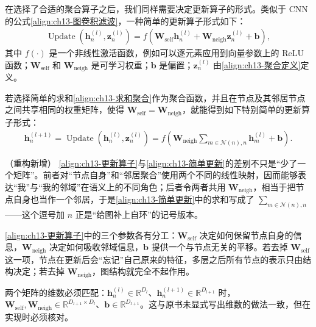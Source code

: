 \documentclass[../../main.tex]{subfiles}
\begin{document}
在选择了合适的聚合算子之后，我们同样需要决定更新算子的形式。类似于 CNN 的公式\eqref{align:ch13-图卷积滤波}，一种简单的更新算子形式如下：
\begin{align}
\operatorname{Update}\!\left(\bm{h}_n^{(l)},\bm{z}_n^{(l)}\right)=f\!\left(\bm{W}_{\mathrm{self}}\bm{h}_n^{(l)}+\bm{W}_{\mathrm{neigh}}\bm{z}_n^{(l)}+\bm{b}\right),
\label{align:ch13-更新算子}
\end{align}
其中 $f(\cdot)$ 是一个非线性激活函数，例如可以逐元素应用到向量参数上的 ReLU 函数；$\bm{W}_{\mathrm{self}}$ 和 $\bm{W}_{\mathrm{neigh}}$ 是可学习权重；$\bm{b}$ 是偏置；$\bm{z}_n^{(l)}$ 由\eqref{align:ch13-聚合定义}定义。

\begin{definition}[更新算子]\label{definition:ch13-更新算子}
若选择简单的求和\eqref{align:ch13-求和聚合}作为聚合函数，并且在节点及其邻居节点之间共享相同的权重矩阵，使得 $\bm{W}_{\mathrm{self}}=\bm{W}_{\mathrm{neigh}}$，就能得到如下特别简单的更新算子形式：
\begin{align}
\bm{h}_n^{(l+1)}=\operatorname{Update}\!\left(\bm{h}_n^{(l)},\bm{z}_n^{(l)}\right)=f\!\left(\bm{W}_{\mathrm{neigh}}\sum_{m\in\mathcal{N}(n),n}\bm{h}_m^{(l)}+\bm{b}\right).
\label{align:ch13-简单更新}
\end{align}
\end{definition}

\begin{remark}（重构新增）
\eqref{align:ch13-更新算子}与\eqref{align:ch13-简单更新}的差别不只是“少了一个矩阵”。前者对“节点自身”和“邻居聚合”使用两个不同的线性映射，因而能够表达“我”与“我的邻域”在语义上的不同角色；后者令两者共用 $\bm{W}_{\mathrm{neigh}}$，相当于把节点自身也当作一个邻居，于是\eqref{align:ch13-简单更新}中的求和写成了 $\sum_{m\in\mathcal{N}(n),n}$——这个逗号加 $n$ 正是“给图补上自环”的记号版本。\par
\eqref{align:ch13-更新算子}中的三个参数各有分工：$\bm{W}_{\mathrm{self}}$ 决定如何保留节点自身的信息，$\bm{W}_{\mathrm{neigh}}$ 决定如何吸收邻域信息，$\bm{b}$ 提供一个与节点无关的平移。若去掉 $\bm{W}_{\mathrm{self}}$ 这一项，节点在更新后会“忘记”自己原来的特征，多层之后所有节点的表示只由结构决定；若去掉 $\bm{W}_{\mathrm{neigh}}$，图结构就完全不起作用。\par
两个矩阵的维数必须匹配：$\bm{h}_n^{(l)}\in\mathbb{R}^{D_l}$、$\bm{h}_n^{(l+1)}\in\mathbb{R}^{D_{l+1}}$ 时，$\bm{W}_{\mathrm{self}},\bm{W}_{\mathrm{neigh}}\in\mathbb{R}^{D_{l+1}\times D_l}$、$\bm{b}\in\mathbb{R}^{D_{l+1}}$。这与原书未显式写出维数的做法一致，但在实现时必须核对。
\end{remark}
\end{document}
